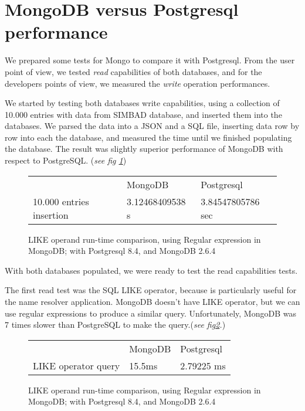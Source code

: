 \documentclass[11pt,twoside]{article}
\begin{document}
\section{MongoDB versus Postgresql performance}
    We prepared some tests for Mongo to compare it with Postgresql. From the user
    point of view, we tested \emph{read} capabilities of both databases, and
    for the developers points of view, we measured the \emph{write} operation
    performances.
    
    We started by testing both databases write capabilities, using a collection of 10.000 entries with data from SIMBAD database,
    and inserted them into the databases. We parsed the data into a JSON and a SQL file, 
    inserting data row by row into each the database, and measured the time until we 
    finished populating the database. The result was slightly superior
    performance of MongoDB with respect to PostgreSQL. (\emph{see fig \ref{fig:insert}})
    
 \begin{figure}
    \centering
    \begin{tabular}{lll}    
                        & MongoDB & Postgresql \\
    10.000 entries insertion & 3.12468409538 s  & 3.84547805786 sec
    \end{tabular}
    \caption{LIKE operand run-time comparison, using Regular expression in MongoDB; with Postgresql 8.4, and MongoDB 2.6.4}
    \label{fig:insert}
\end{figure}   
    
    With both databases populated, we were ready to test the read capabilities tests.
    
    The first read test was the SQL LIKE operator, because is particularly
    useful for the name resolver application. 
    MongoDB doesn't have LIKE operator, but we can use regular expressions to
    produce a similar query. Unfortunately, MongoDB was 7 times slower than
    PostgreSQL to make the query.(\emph{see fig\ref{fig:like}.})
\begin{figure}
    \centering
    \begin{tabular}{lll}    
                        & MongoDB & Postgresql \\
    LIKE operator query & 15.5ms  & 2.79225 ms
    \end{tabular}
    \caption{LIKE operand run-time comparison, using Regular expression in MongoDB; with Postgresql 8.4, and MongoDB 2.6.4}
    \label{fig:like}
\end{figure}
\end{document}

